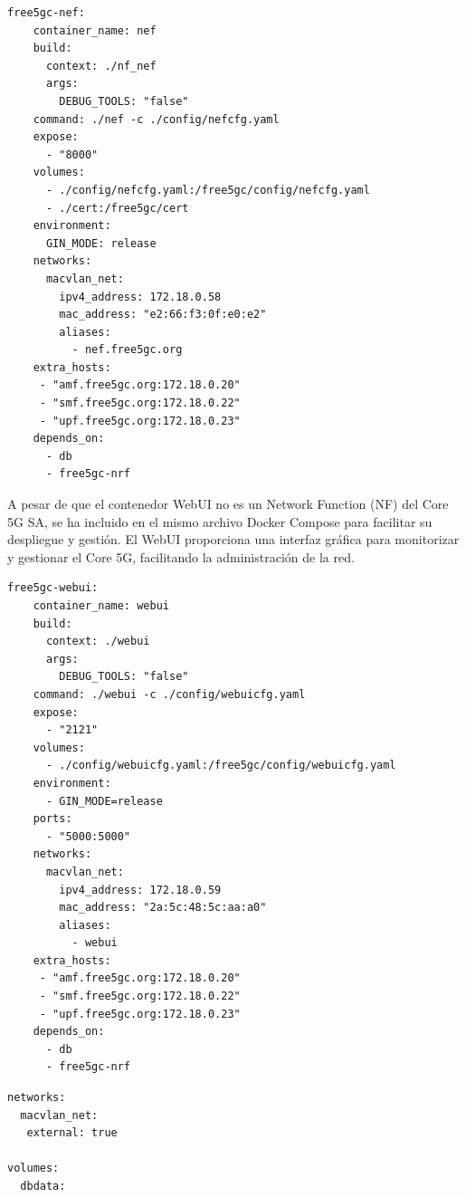 \begin{lstlisting}[style=yamlstyle, caption={Configuración del NEF en Docker Compose}, label=lst:docker-nef]
  free5gc-nef:
    container_name: nef
    build:
      context: ./nf_nef
      args:
        DEBUG_TOOLS: "false"
    command: ./nef -c ./config/nefcfg.yaml
    expose:
      - "8000"
    volumes: 
      - ./config/nefcfg.yaml:/free5gc/config/nefcfg.yaml
      - ./cert:/free5gc/cert
    environment:
      GIN_MODE: release
    networks:
      macvlan_net:
        ipv4_address: 172.18.0.58
        mac_address: "e2:66:f3:0f:e0:e2"
        aliases:
          - nef.free5gc.org
    extra_hosts:
     - "amf.free5gc.org:172.18.0.20"
     - "smf.free5gc.org:172.18.0.22"
     - "upf.free5gc.org:172.18.0.23"
    depends_on:
      - db
      - free5gc-nrf
\end{lstlisting}
A pesar de que el contenedor WebUI no es un Network Function (NF) del Core 5G SA, se ha incluido en el mismo archivo Docker Compose para facilitar su despliegue y gestión. El WebUI proporciona una interfaz gráfica para monitorizar y gestionar el Core 5G, facilitando la administración de la red.
\begin{lstlisting}[style=yamlstyle, caption={Configuración del WebUI en Docker Compose}, label=lst:docker-webui]
  free5gc-webui:
    container_name: webui
    build:
      context: ./webui
      args:
        DEBUG_TOOLS: "false"
    command: ./webui -c ./config/webuicfg.yaml
    expose:
      - "2121"
    volumes:
      - ./config/webuicfg.yaml:/free5gc/config/webuicfg.yaml
    environment:
      - GIN_MODE=release
    ports:
      - "5000:5000"
    networks:
      macvlan_net:
        ipv4_address: 172.18.0.59
        mac_address: "2a:5c:48:5c:aa:a0"
        aliases:
          - webui
    extra_hosts:
     - "amf.free5gc.org:172.18.0.20"
     - "smf.free5gc.org:172.18.0.22"
     - "upf.free5gc.org:172.18.0.23"
    depends_on:
      - db
      - free5gc-nrf
\end{lstlisting}
\begin{lstlisting}[style=yamlstyle, caption={Configuración de red y volúmenes en Docker Compose}, label=lst:docker-network-volumes]
networks:
  macvlan_net:
   external: true
   
volumes:
  dbdata:
\end{lstlisting}



